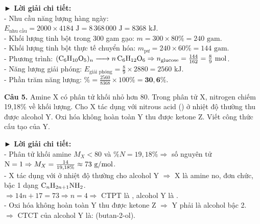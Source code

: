 \documentclass[11pt,a4paper]{article}
\begin{document}
\begin{tcolorbox}[colback=white,colframe=solBlue,arc=1mm,boxrule=0.5pt,top=2mm,bottom=2mm,left=3mm,right=3mm]
{\color{solBlue}\textbf{► Lời giải chi tiết:}}\\
- Nhu cầu năng lượng hàng ngày: $E_{\text{nhu cầu}} = 2000 \times 4184\text{ J} = 8\,368\,000\text{ J} = 8368\text{ kJ}$.\\
- Khối lượng tinh bột trong 300 gam gạo: $m = 300 \times 80\% = 240\text{ gam}$.\\
- Khối lượng tinh bột thực tế chuyển hóa: $m_{\text{pư}} = 240 \times 60\% = 144\text{ gam}$.\\
- Phương trình: $\ce{(C6H10O5)_n -> n C6H12O6} \Rightarrow n_{\text{glucose}} = \frac{144}{162} = \frac{8}{9}\text{ mol}$.\\
- Năng lượng giải phóng: $E_{\text{giải phóng}} = \frac{8}{9} \times 2880 = 2560\text{ kJ}$.\\
- Phần trăm năng lượng: $\% = \frac{2560}{8368} \times 100\% = \mathbf{30{,}6\%}$.
\end{tcolorbox}

\vspace{6pt}
\noindent\textbf{Câu 5.} Amine X có phân tử khối nhỏ hơn 80. Trong phân tử X, nitrogen chiếm 19,18\% về khối lượng. Cho X tác dụng với nitrous acid () ở nhiệt độ thường thu được alcohol Y. Oxi hóa không hoàn toàn Y thu được ketone Z. Viết công thức cấu tạo của Y.

\begin{tcolorbox}[colback=white,colframe=solBlue,arc=1mm,boxrule=0.5pt,top=2mm,bottom=2mm,left=3mm,right=3mm]
{\color{solBlue}\textbf{► Lời giải chi tiết:}}\\
- Phân tử khối amine $M_X < 80$ và $\%N = 19{,}18\% \Rightarrow$ số nguyên tử $\ce{N} = 1 \Rightarrow M_X = \frac{14}{19{,}18\%} \approx 73\text{ g/mol}$.\\
- X tác dụng với  ở nhiệt độ thường cho alcohol Y $\Rightarrow$ X là amine no, đơn chức, bậc 1 dạng $\ce{C_nH_{2n+1}NH2}$.\\
$\Rightarrow 14n + 17 = 73 \Rightarrow n = 4 \Rightarrow$ CTPT là , alcohol Y là .\\
- Oxi hóa không hoàn toàn Y thu được ketone Z $\Rightarrow$ Y phải là alcohol bậc 2.\\
$\Rightarrow$ CTCT của alcohol Y là: \textbf{} (butan-2-ol).
\end{tcolorbox}
\end{document}
